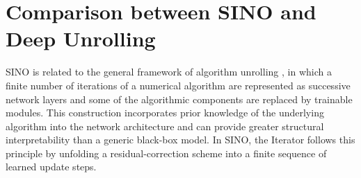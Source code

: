 \documentclass[preprint,numbers,sort&compress]{elsarticle}
\newtheorem{remark}{Remark}
\begin{document}
				
			
			
			
			\section{Comparison between SINO and Deep Unrolling}
			\label{Comparison}
			SINO is related to the general framework of algorithm unrolling
			\cite{monga2021algorithm}, in which a finite number of iterations of a numerical algorithm are represented as successive network layers and some of the algorithmic components are replaced by trainable modules. This construction incorporates prior knowledge of the underlying algorithm into the network architecture and can provide greater structural interpretability than a generic black-box model. In SINO, the Iterator follows this principle by unfolding a residual-correction scheme into a finite sequence of learned update steps.
			
\end{document}
